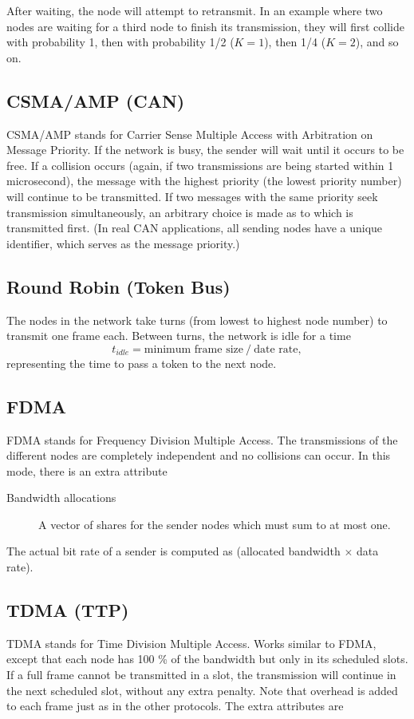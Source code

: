 \documentclass[final,twoside]{rapport}
\begin{document}
After waiting, the node will attempt to retransmit. In an example
where two nodes are  waiting for a third node to finish its
transmission, they will first collide with probability 1, then with
probability 1/2 ($K=1$), then 1/4 
($K=2$), and so on.

\subsection{CSMA/AMP (CAN)}
CSMA/AMP stands for Carrier Sense Multiple Access with Arbitration on
Message Priority. If the network is busy, the sender will wait until it
occurs to be free. If a collision occurs (again, if two transmissions
are being started within 1 microsecond), the message with the highest
priority (the lowest priority number) will continue to 
be transmitted. If two messages with the same priority seek
transmission simultaneously, an arbitrary choice is made as to which
is transmitted first. (In real CAN applications, all sending nodes
have a unique identifier, which serves as the message priority.)

\subsection{Round Robin (Token Bus)}
The nodes in the network take turns (from lowest to highest node
number) to transmit one frame each. Between turns, the network is idle
for a time
\[
t_\mathit{idle} = \text{minimum frame size} \  /\  \text{date rate},
\]
representing the time to pass a token to the next node.

\subsection{FDMA}
FDMA stands for Frequency Division Multiple Access. The transmissions
of the different nodes are completely independent and no collisions
can occur. In this mode, there is an extra attribute

\begin{description}
\item[Bandwidth allocations] A vector of shares for the sender nodes
  which must sum to at most one.
\end{description}

The actual bit rate of a sender is computed as (allocated bandwidth
$\times$ data rate).

\subsection{TDMA (TTP)}
TDMA stands for Time Division Multiple Access. Works similar to FDMA,
except that each node has 100 \% of the bandwidth but only 
in its scheduled slots. If a full frame cannot be transmitted in
a slot, the transmission will continue in the next scheduled slot,
without any extra penalty. Note that overhead is added to each frame
just as in the other protocols. The extra attributes are
\end{document}
